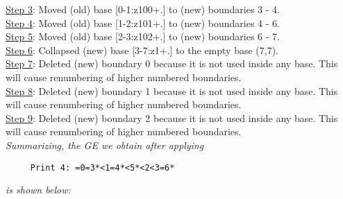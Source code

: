 \documentclass[final]{article}
\begin{document}
{\underline{Step 3}:} Moved (old) base [0-1:z100+.]  to (new) boundaries 3 - 4.\\
{\underline{Step 4}:} Moved (old) base [1-2:z101+.]  to (new) boundaries 4 - 6.\\
{\underline{Step 5}:} Moved (old) base [2-3:z102+.]  to (new) boundaries 6 - 7.\\
{\underline{Step 6}:} Collapsed (new) base [3-7:z1+.]  to the empty base (7,7).
\\
{\underline{Step 7}:} Deleted (new) boundary 0 because it is not used inside any base.  This will cause renumbering of higher numbered boundaries.
\\
{\underline{Step 8}:} Deleted (new) boundary 1 because it is not used inside any base.  This will cause renumbering of higher numbered boundaries.
\\
{\underline{Step 9}:} Deleted (new) boundary 2 because it is not used inside any base.  This will cause renumbering of higher numbered boundaries.
\\[0.1in]
{\em Summarizing, the GE we obtain after applying}
\begin{verbatim}
     Print 4: =0=3*<1=4*<5*<2<3=6*
\end{verbatim}
{\em is shown below:}
\end{document}
